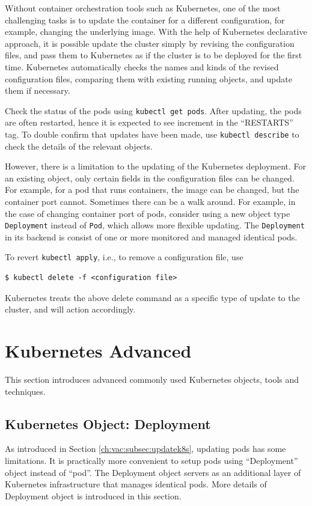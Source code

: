 Without container orchestration tools such as Kubernetes, one of the most challenging tasks is to update the container for a different configuration, for example, changing the underlying image. With the help of Kubernetes declarative approach, it is possible update the cluster simply by revising the configuration files, and pass them to Kubernetes as if the cluster is to be deployed for the first time. Kubernetes automatically checks the names and kinds of the revised configuration files, comparing them with existing running objects, and update them if necessary.

Check the status of the pods using \verb|kubectl get pods|. After updating, the pods are often restarted, hence it is expected to see increment in the ``RESTARTS'' tag. To double confirm that updates have been made, use \verb|kubectl describe| to check the details of the relevant objects.

However, there is a limitation to the updating of the Kubernetes deployment. For an existing object, only certain fields in the configuration files can be changed. For example, for a pod that runs containers, the image can be changed, but the container port cannot. Sometimes there can be a walk around. For example, in the case of changing container port of pods, consider using a new object type \verb|Deployment| instead of \verb|Pod|, which allows more flexible updating. The \verb|Deployment| in its backend is consist of one or more monitored and managed identical pods.

To revert \verb|kubectl apply|, i.e., to remove a configuration file, use
\begin{lstlisting}
$ kubectl delete -f <configuration file>
\end{lstlisting}
Kubernetes treats the above delete command as a specific type of update to the cluster, and will action accordingly.

\section{Kubernetes Advanced}

This section introduces advanced commonly used Kubernetes objects, tools and techniques.

\subsection{Kubernetes Object: Deployment} \label{ch:vac:subsec:deployment}

As introduced in Section \ref{ch:vac:subsec:updatek8s}, updating pods has some limitations. It is practically more convenient to setup pods using ``Deployment'' object instead of ``pod''. The Deployment object servers as an additional layer of Kubernetes infrastructure that manages identical pods. More details of Deployment object is introduced in this section.

